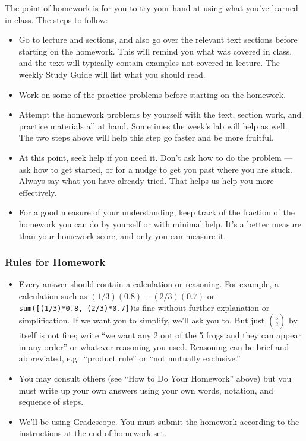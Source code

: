 \documentclass[11pt]{article}
\providecommand{\tightlist}{%
      \setlength{\itemsep}{0pt}\setlength{\parskip}{0pt}}
\begin{document}
The point of homework is for you to try your hand at using what you've
learned in class. The steps to follow:

\begin{itemize}
\tightlist
\item
  Go to lecture and sections, and also go over the relevant text
  sections before starting on the homework. This will remind you what
  was covered in class, and the text will typically contain examples not
  covered in lecture. The weekly Study Guide will list what you should
  read.
\item
  Work on some of the practice problems before starting on the homework.
\item
  Attempt the homework problems by yourself with the text, section work,
  and practice materials all at hand. Sometimes the week's lab will help
  as well. The two steps above will help this step go faster and be more
  fruitful.
\item
  At this point, seek help if you need it. Don't ask how to do the
  problem --- ask how to get started, or for a nudge to get you past
  where you are stuck. Always say what you have already tried. That
  helps us help you more effectively.
\item
  For a good measure of your understanding, keep track of the fraction
  of the homework you can do by yourself or with minimal help. It's a
  better measure than your homework score, and only you can measure it.
\end{itemize}

    \subsubsection{Rules for Homework}\label{rules-for-homework}

\begin{itemize}
\tightlist
\item
  Every answer should contain a calculation or reasoning. For example, a
  calculation such as \((1/3)(0.8) + (2/3)(0.7)\) or
  \texttt{sum({[}(1/3)*0.8,\ (2/3)*0.7{]})}is fine without further
  explanation or simplification. If we want you to simplify, we'll ask
  you to. But just \({5 \choose 2}\) by itself is not fine; write ``we
  want any 2 out of the 5 frogs and they can appear in any order'' or
  whatever reasoning you used. Reasoning can be brief and abbreviated,
  e.g.~``product rule'' or ``not mutually exclusive.''
\item
  You may consult others (see ``How to Do Your Homework'' above) but you
  must write up your own answers using your own words, notation, and
  sequence of steps.
\item
  We'll be using Gradescope. You must submit the homework according to
  the instructions at the end of homework set.
\end{itemize}
\end{document}
